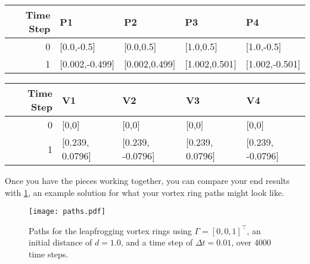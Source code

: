 \documentclass{article}
\begin{document}
\renewcommand{\arraystretch}{1.5}
\begin{tabular}{r | l | l | l | l }
	Time Step & P1 & P2 & P3 & P4  \\
	\hline
	0  & [0.0,-0.5] & [0.0,0.5] & [1.0,0.5] & [1.0,-0.5]   \\
	1 & [0.002,-0.499] & [0.002,0.499] & [1.002,0.501] & [1.002,-0.501] 
\end{tabular}

\bigskip 

\renewcommand{\arraystretch}{1.5}
\begin{tabular}{r | l | l | l | l  }
	Time Step & V1 & V2 & V3 & V4 \\
	\hline
	0   & [0,0] & [0,0] & [0,0] & [0,0]  \\
	1 & [0.239, 0.0796] & [0.239, -0.0796] & [0.239, 0.0796] & [0.239, -0.0796]  
\end{tabular}

Once you have the pieces working together, you can compare your end results with \cref{fig:vortexpaths}, an example solution for what your vortex ring paths might look like. 

\begin{figure}[htb]
	\centering
	\texttt{[image: paths.pdf]}
	\caption{Paths for the leapfrogging vortex rings using $\Gamma = [0,0,1]^\top$, an initial distance of $d=1.0$, and a time step of $\Delta t =0.01$, over 4000 time steps.}
	\label{fig:vortexpaths}
\end{figure}
\end{document}
